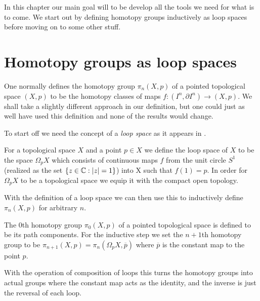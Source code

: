 \documentclass[../main.tex]{subfiles}
\begin{document}
In this chapter our main goal will to be develop all the tools we need
for what is to come. We start out by defining homotopy groups inductively
as loop spaces before moving on to some other stuff.

\section{Homotopy groups as loop spaces}
One normally defines the homotopy group \( \pi_n(X,p) \) of a pointed
topological space \( (X,p) \) to be the homotopy classes of maps
\( f:(I^n, \partial I^n)\rightarrow (X, p) \). We shall take a slightly
different approach in our definition, but one could just as well have used
this definition and none of the results would change.

To start off we need the concept of a \emph{loop space} as it appears in
\cite{BoTu82} .
\begin{definition}
   For a topological space \( X \) and a point \( p \in X \)
   we define the loop space of \( X \)
   to be the space \( \Omega_p X \) which consists of continuous maps \( f \)
   from the unit circle \( S^1 \)(realized as the set \( \{z \in 
   \mathbb{C} : \lvert z\rvert=1\}  \)) into X such that \( f(1)=p \). In order for
   \( \Omega_p X \) to be a topological space we equip it with the
   compact open topology.
\end{definition}
With the definition of a loop space we can then use this to inductively
define \( \pi_n(X, p) \) for arbitrary \( n \).
\begin{definition}
   The \( 0 \)th homotopy group \( \pi_0 (X, p) \) of a pointed topological space
   is defined to be its path components. For the inductive step
   we set the \( n+1 \)th homotopy group to be \( \pi_{n+1}(X,p) = \pi_n(\Omega_{p}X, \overline{p})\)
   where \( \overline{p} \) is the constant map to the point \( p \).
\end{definition}
With the operation of composition of loops this turns the homotopy
groups into actual groups where the constant map acts as the identity,
and the inverse is just the reversal of each loop.
\end{document}
